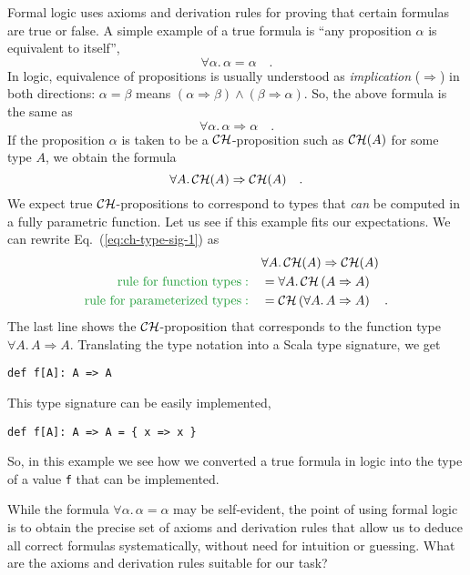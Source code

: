 Formal logic uses axioms and derivation rules for proving that certain
formulas are true or false. A simple example of a true formula is
``any proposition $\alpha$ is equivalent to itself'',
\[
\forall\alpha.\,\alpha=\alpha\quad.
\]
In logic, equivalence of propositions is usually understood as \emph{implication}
($\Rightarrow$) in both directions: $\alpha=\beta$ means $\left(\alpha\Rightarrow\beta\right)\wedge\left(\beta\Rightarrow\alpha\right)$.
So, the above formula is the same as
\[
\forall\alpha.\,\alpha\Rightarrow\alpha\quad.
\]
If the proposition $\alpha$ is taken to be a ${\cal CH}$-proposition
such as ${\cal CH}(A)$ for some type $A$, we obtain the formula
\begin{equation}
\forall A.\,{\cal CH}(A)\Rightarrow{\cal CH}(A)\quad.\label{eq:ch-type-sig-1}
\end{equation}
We expect true ${\cal CH}$-propositions to correspond to types that
\emph{can} be computed in a fully parametric function. Let us see
if this example fits our expectations. We can rewrite Eq.~(\ref{eq:ch-type-sig-1})
as
\begin{align*}
 & \forall A.\,{\cal CH}(A)\Rightarrow{\cal CH}(A)\\
{\color{greenunder}\text{rule for function types}:}\quad & =\forall A.\,{\cal CH}\left(A\Rightarrow A\right)\\
{\color{greenunder}\text{rule for parameterized types}:}\quad & ={\cal CH}\left(\forall A.\,A\Rightarrow A\right)\quad.
\end{align*}
The last line shows the ${\cal CH}$-proposition that corresponds
to the function type $\forall A.\,A\Rightarrow A$. Translating the
type notation into a Scala type signature, we get
\begin{lstlisting}
def f[A]: A => A
\end{lstlisting}
This type signature can be easily implemented,
\begin{lstlisting}
def f[A]: A => A = { x => x }
\end{lstlisting}
So, in this example we see how we converted a true formula in logic
into the type of a value \lstinline!f!
that can be implemented.

While the formula $\forall\alpha.\,\alpha=\alpha$ may be self-evident,
the point of using formal logic is to obtain the precise set of axioms
and derivation rules that allow us to deduce all correct formulas
systematically, without need for intuition or guessing. What are the
axioms and derivation rules suitable for our task?

